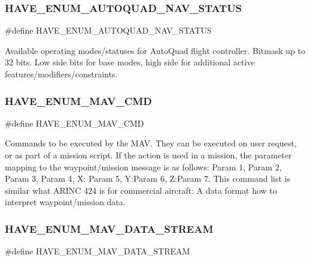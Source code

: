 \subsubsection{H\+A\+V\+E\+\_\+\+E\+N\+U\+M\+\_\+\+A\+U\+T\+O\+Q\+U\+A\+D\+\_\+\+N\+A\+V\+\_\+\+S\+T\+A\+T\+US}
{\footnotesize\ttfamily \#define H\+A\+V\+E\+\_\+\+E\+N\+U\+M\+\_\+\+A\+U\+T\+O\+Q\+U\+A\+D\+\_\+\+N\+A\+V\+\_\+\+S\+T\+A\+T\+US}



Available operating modes/statuses for Auto\+Quad flight controller. Bitmask up to 32 bits. Low side bits for base modes, high side for additional active features/modifiers/constraints. 

\mbox{\label{autoquad_8h_a073ec1e277b3d058a124e241c473d5ee}} 
\subsubsection{H\+A\+V\+E\+\_\+\+E\+N\+U\+M\+\_\+\+M\+A\+V\+\_\+\+C\+MD}
{\footnotesize\ttfamily \#define H\+A\+V\+E\+\_\+\+E\+N\+U\+M\+\_\+\+M\+A\+V\+\_\+\+C\+MD}



Commands to be executed by the M\+AV. They can be executed on user request, or as part of a mission script. If the action is used in a mission, the parameter mapping to the waypoint/mission message is as follows\+: Param 1, Param 2, Param 3, Param 4, X\+: Param 5, Y\+:Param 6, Z\+:Param 7. This command list is similar what A\+R\+I\+NC 424 is for commercial aircraft\+: A data format how to interpret waypoint/mission data. 

\mbox{\label{autoquad_8h_a0b14132efff94f45db406fcd21223a6b}} 
\subsubsection{H\+A\+V\+E\+\_\+\+E\+N\+U\+M\+\_\+\+M\+A\+V\+\_\+\+D\+A\+T\+A\+\_\+\+S\+T\+R\+E\+AM}
{\footnotesize\ttfamily \#define H\+A\+V\+E\+\_\+\+E\+N\+U\+M\+\_\+\+M\+A\+V\+\_\+\+D\+A\+T\+A\+\_\+\+S\+T\+R\+E\+AM}



